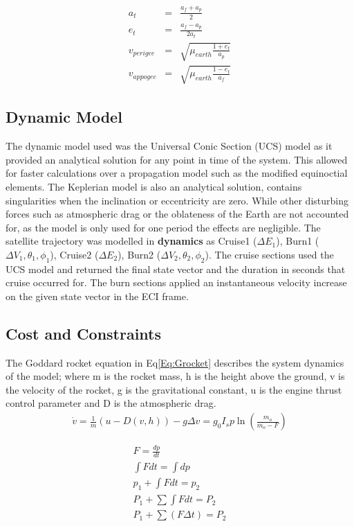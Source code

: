 \documentclass[Space3_Assign3.tex]{subfile}
\begin{document}
\begin{eqnarray}
a_t &=& \frac{a_f+a_p}{2}\\
e_t &=& \frac{a_f-a_p}{2a_t}\\
v_{perigee} &=& \sqrt{\mu_{earth}\frac{1+e_t}{a_p}}\\
v_{appogee} &=& \sqrt{\mu_{earth}\frac{1-e_t}{a_f}}
\end{eqnarray}


\subsection{Dynamic Model}
The dynamic model used was the Universal Conic Section (UCS) model as it provided an analytical solution for any point in time of the system. This allowed for faster calculations over a propagation model such as the modified equinoctial elements. The Keplerian model is also an analytical solution, contains singularities when the inclination or eccentricity are zero. While other disturbing forces such as atmospheric drag or the oblateness of the Earth are not accounted for, as the model is only used for one period the effects are negligible. The satellite trajectory was modelled in \textbf{dynamics} as Cruise1 ($\Delta E_1$), Burn1 ($\Delta V_1,\theta_1,\phi_1$), Cruise2 ($\Delta E_2$), Burn2 ($\Delta V_2,\theta_2,\phi_2$). The cruise sections used the UCS model and returned the final state vector and the duration in seconds that cruise occurred for. The burn sections applied an instantaneous velocity increase on the given state vector in the ECI frame. 



\subsection{Cost and Constraints}
The Goddard rocket equation in Eq\ref{Eq:Grocket} describes the system dynamics of the model; where m is the rocket mass, h is the height above the ground, v is the velocity of the rocket, g is the gravitational constant, u is the engine thrust control parameter and D is the atmospheric drag.
\begin{eqnarray}
\dot{v} = \frac{1}{m}(u-D(v,h)) - g \label{Eq:Grocket}
\Delta v = g_0I_sp\ln(\frac{m_o}{m_o-F}) \label{Eq:delV}
\end{eqnarray}

\begin{eqnarray}
F = \frac{dp}{dt}\\
\int F dt = \int dp \\
p_1 +\int F dt = p_2 \\
P_1 + \sum \int F dt = P_2\\
P_1 +\sum(F\Delta t) = P_2 \\
\end{eqnarray}
\end{document}
